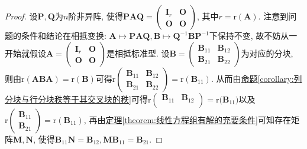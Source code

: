 \documentclass[../../main.tex]{subfiles}%
\begin{document}
\begin{proof}
设\(\boldsymbol{P},\boldsymbol{Q}\)为\(n\)阶非异阵, 使得\(\boldsymbol{PAQ}=\begin{pmatrix}\boldsymbol{I}_{r}&\boldsymbol{O}\\\boldsymbol{O}&\boldsymbol{O}\end{pmatrix}\), 其中\(r = \mathrm{r}(\boldsymbol{A})\). 注意到问题的条件和结论在相抵变换: \(\boldsymbol{A}\mapsto\boldsymbol{PAQ},\boldsymbol{B}\mapsto\boldsymbol{Q}^{-1}\boldsymbol{BP}^{-1}\)下保持不变, 故不妨从一开始就假设\(\boldsymbol{A}=\begin{pmatrix}\boldsymbol{I}_{r}&\boldsymbol{O}\\\boldsymbol{O}&\boldsymbol{O}\end{pmatrix}\)是相抵标准型. 设\(\boldsymbol{B}=\begin{pmatrix}\boldsymbol{B}_{11}&\boldsymbol{B}_{12}\\\boldsymbol{B}_{21}&\boldsymbol{B}_{22}\end{pmatrix}\)为对应的分块, 则由\(\mathrm{r}(\boldsymbol{ABA})=\mathrm{r}(\boldsymbol{B})\)可得\(\mathrm{r}\begin{pmatrix}\boldsymbol{B}_{11}&\boldsymbol{B}_{12}\\\boldsymbol{B}_{21}&\boldsymbol{B}_{22}\end{pmatrix}=\mathrm{r}(\boldsymbol{B}_{11})\). 从而由\hyperref[corollary:列分块与行分块秩等于其交叉块的秩]{命题\ref{corollary:列分块与行分块秩等于其交叉块的秩}}可得\(\mathrm{r}\left( \begin{matrix}
\boldsymbol{B}_{11}&		\boldsymbol{B}_{12}\\
\end{matrix} \right) =\mathrm{r(}\boldsymbol{B}_{11})\)以及\(\mathrm{r}\begin{pmatrix}\boldsymbol{B}_{11}\\\boldsymbol{B}_{21}\end{pmatrix}=\mathrm{r}(\boldsymbol{B}_{11})\), 再由\hyperref[theorem:线性方程组有解的充要条件]{定理\ref{theorem:线性方程组有解的充要条件}}可知存在矩阵\(\boldsymbol{M},\boldsymbol{N}\), 使得\(\boldsymbol{B}_{11}\boldsymbol{N}=\boldsymbol{B}_{12},\boldsymbol{M}\boldsymbol{B}_{11}=\boldsymbol{B}_{21}\). 


\end{proof}
\end{document}
